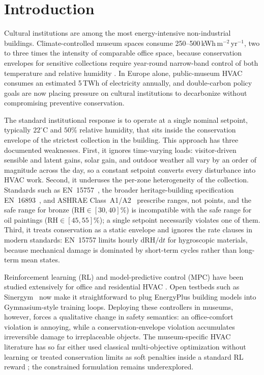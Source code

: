 \section{Introduction}\label{sec:intro}

Cultural institutions are among the most energy-intensive non-industrial
buildings. Climate-controlled museum spaces consume
250--500\,kWh\,m$^{-2}$\,yr$^{-1}$, two to three times the intensity of
comparable office space, because conservation envelopes for sensitive
collections require year-round narrow-band control of both temperature and
relative humidity \citep{ashrae_handbook_ch24,verticchio2024microclimate}.
In Europe alone, public-museum HVAC consumes an estimated 5\,TWh of
electricity annually, and double-carbon policy goals are now placing
pressure on cultural institutions to decarbonize without compromising
preventive conservation.

The standard institutional response is to operate at a single nominal
setpoint, typically $22^\circ\mathrm{C}$ and $50\%$ relative humidity, that
sits inside the conservation envelope of the strictest collection in the
building. This approach has three documented weaknesses. First, it ignores
time-varying loads: visitor-driven sensible and latent gains, solar gain,
and outdoor weather all vary by an order of magnitude across the day, so
a constant setpoint converts every disturbance into HVAC work. Second, it
underuses the per-zone heterogeneity of the collection. Standards such as
EN~15757~\citep{en15757}, the broader heritage-building specification
EN~16893~\citep{en16893}, and ASHRAE Class~A1/A2~\citep{ashrae_handbook_ch24}
prescribe ranges, not points, and the safe range for bronze
($\mathrm{RH}\in[30,40]\%$) is incompatible with the safe range for oil
paintings ($\mathrm{RH}\in[45,55]\%$); a single setpoint necessarily
violates one of them. Third, it treats conservation as a static envelope
and ignores the rate clauses in modern standards: EN~15757 limits hourly
$\mathrm{d}\mathrm{RH}/\mathrm{d}t$ for hygroscopic materials, because
mechanical damage is dominated by short-term cycles rather than long-term
mean states.

Reinforcement learning (RL) and model-predictive control (MPC) have been
studied extensively for office and residential HVAC
\citep{brandi2022online,wang2017drlhvac,drgona2020mpc_review}. Open
testbeds such as Sinergym~\citep{manjavacas2024sinergym} now make it
straightforward to plug EnergyPlus building models into Gymnasium-style
training loops. Deploying these controllers in museums, however, forces a
qualitative change in safety semantics: an office-comfort violation is
annoying, while a conservation-envelope violation accumulates irreversible
damage to irreplaceable objects. The museum-specific HVAC literature has
so far either used classical multi-objective optimization without learning
\citep{ascione2018museum,schito2020museum} or treated conservation limits
as soft penalties inside a standard RL reward
\citep{green_smart_museums_2025,boesgaard2022heritage}; the constrained
formulation remains underexplored.

